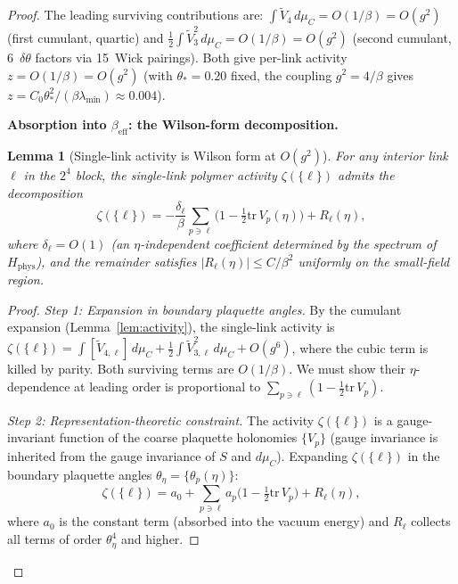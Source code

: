 \documentclass[11pt]{article}
\newtheorem{lemma}[theorem]{Lemma}
\theoremstyle{definition}
\newcommand{\tr}{\mathrm{tr}}
\begin{document}
\begin{proof}
The leading surviving contributions are:
$\int\widetilde{V}_{4}\,d\mu_C=O(1/\beta)=O(g^2)$ (first cumulant, quartic)
and
$\frac{1}{2}\int\widetilde{V}_{3}^2\,d\mu_C=O(1/\beta)=O(g^2)$ (second
cumulant, 6~$\delta\theta$ factors via 15~Wick pairings).
Both give per-link activity $z=O(1/\beta)=O(g^2)$ (with
$\theta_*=0.20$ fixed, the coupling $g^2=4/\beta$ gives
$z=C_0\theta_*^2/(\beta\lambda_{\min})\approx 0.004$).

\textbf{Absorption into $\beta_{\mathrm{eff}}$:
the Wilson-form decomposition.}

\begin{lemma}[Single-link activity is Wilson form at $O(g^2)$]%
\label{lem:wilson-form}
For any interior link $\ell$ in the $2^4$ block, the single-link
polymer activity $\zeta(\{\ell\})$ admits the decomposition
\begin{equation}\label{eq:wilson-decomp}
\zeta(\{\ell\})
=-\frac{\delta_\ell}{\beta}\sum_{p\ni\ell}
\bigl(1-\tfrac{1}{2}\tr\,V_p(\eta)\bigr)
+R_\ell(\eta),
\end{equation}
where $\delta_\ell=O(1)$ (an $\eta$-independent coefficient determined
by the spectrum of $H_{\mathrm{phys}}$), and the remainder satisfies
$|R_\ell(\eta)|\le C/\beta^2$ uniformly on the small-field region.
\end{lemma}

\begin{proof}
\emph{Step 1: Expansion in boundary plaquette angles.}
By the cumulant expansion (Lemma~\ref{lem:activity}), the
single-link activity is
$\zeta(\{\ell\})=\int[\widetilde{V}_{4,\ell}]\,d\mu_C
+\frac{1}{2}\int\widetilde{V}_{3,\ell}^2\,d\mu_C+O(g^6)$,
where the cubic term is killed by parity.  Both surviving
terms are $O(1/\beta)$.  We must show their $\eta$-dependence
at leading order is proportional to
$\sum_{p\ni\ell}(1-\frac{1}{2}\tr\,V_p)$.

\emph{Step 2: Representation-theoretic constraint.}
The activity $\zeta(\{\ell\})$ is a gauge-invariant function of
the coarse plaquette holonomies $\{V_p\}$ (gauge invariance is
inherited from the gauge invariance of $S$ and $d\mu_C$).
Expanding $\zeta(\{\ell\})$ in the boundary plaquette angles
$\theta_\eta=\{\theta_p(\eta)\}$:
\[
\zeta(\{\ell\})=a_0+\sum_{p\ni\ell}a_p
\bigl(1-\tfrac{1}{2}\tr\,V_p\bigr)+R_\ell(\eta),
\]
where $a_0$ is the constant term (absorbed into the vacuum energy)
and $R_\ell$ collects all terms of order $\theta_\eta^4$ and higher.


\end{proof}
\end{proof}
\end{document}
